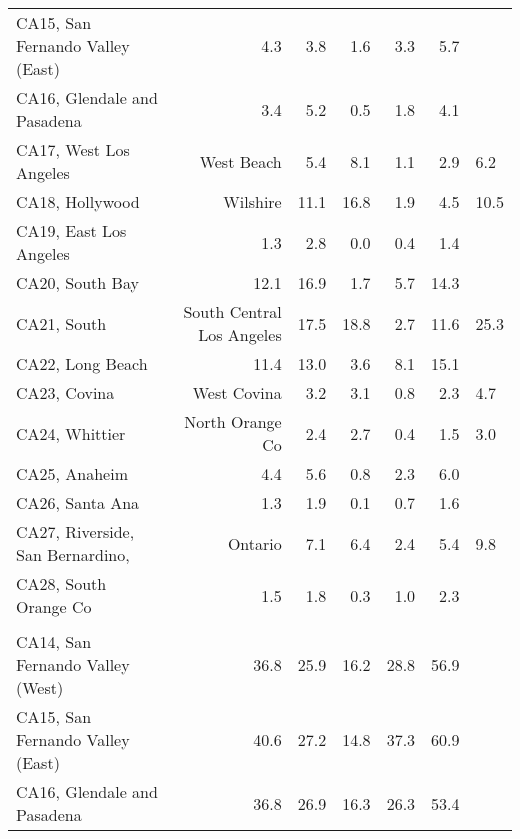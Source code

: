 \begin{longtable}[l]{l|rrrrr}
\hspace{1em}CA15, San Fernando Valley (East) & 4.3 & 3.8 & 1.6 & 3.3 & 5.7\\
\hspace{1em}CA16, Glendale and Pasadena & 3.4 & 5.2 & 0.5 & 1.8 & 4.1\\
\hspace{1em}CA17, West Los Angeles & West Beach & 5.4 & 8.1 & 1.1 & 2.9 & 6.2\\
\hspace{1em}CA18, Hollywood & Wilshire & 11.1 & 16.8 & 1.9 & 4.5 & 10.5\\
\hspace{1em}CA19, East Los Angeles & 1.3 & 2.8 & 0.0 & 0.4 & 1.4\\
\hspace{1em}CA20, South Bay & 12.1 & 16.9 & 1.7 & 5.7 & 14.3\\
\hspace{1em}CA21, South & South Central Los Angeles & 17.5 & 18.8 & 2.7 & 11.6 & 25.3\\
\hspace{1em}CA22, Long Beach & 11.4 & 13.0 & 3.6 & 8.1 & 15.1\\
\hspace{1em}CA23, Covina & West Covina & 3.2 & 3.1 & 0.8 & 2.3 & 4.7\\
\hspace{1em}CA24, Whittier & North Orange Co & 2.4 & 2.7 & 0.4 & 1.5 & 3.0\\
\hspace{1em}CA25, Anaheim & 4.4 & 5.6 & 0.8 & 2.3 & 6.0\\
\hspace{1em}CA26, Santa Ana & 1.3 & 1.9 & 0.1 & 0.7 & 1.6\\
\hspace{1em}CA27, Riverside, San Bernardino, & Ontario & 7.1 & 6.4 & 2.4 & 5.4 & 9.8\\
\hspace{1em}CA28, South Orange Co & 1.5 & 1.8 & 0.3 & 1.0 & 2.3\\
\addlinespace[0.5em]
\\
\hspace{1em}CA14, San Fernando Valley (West) & 36.8 & 25.9 & 16.2 & 28.8 & 56.9\\
\hspace{1em}CA15, San Fernando Valley (East) & 40.6 & 27.2 & 14.8 & 37.3 & 60.9\\
\hspace{1em}CA16, Glendale and Pasadena & 36.8 & 26.9 & 16.3 & 26.3 & 53.4\\

\end{longtable}
